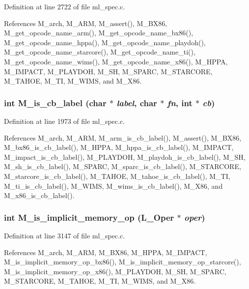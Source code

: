Definition at line 2722 of file ml\_\-spec.c.

References M\_\-arch, M\_\-ARM, M\_\-assert(), M\_\-BX86, M\_\-get\_\-opcode\_\-name\_\-arm(), M\_\-get\_\-opcode\_\-name\_\-bx86(), M\_\-get\_\-opcode\_\-name\_\-hppa(), M\_\-get\_\-opcode\_\-name\_\-playdoh(), M\_\-get\_\-opcode\_\-name\_\-starcore(), M\_\-get\_\-opcode\_\-name\_\-ti(), M\_\-get\_\-opcode\_\-name\_\-wims(), M\_\-get\_\-opcode\_\-name\_\-x86(), M\_\-HPPA, M\_\-IMPACT, M\_\-PLAYDOH, M\_\-SH, M\_\-SPARC, M\_\-STARCORE, M\_\-TAHOE, M\_\-TI, M\_\-WIMS, and M\_\-X86.
\subsubsection{\setlength{\rightskip}{0pt plus 5cm}int M\_\-is\_\-cb\_\-label (char $\ast$ {\em label}, char $\ast$ {\em fn}, int $\ast$ {\em cb})}\label{ml__spec_8c_debfbc23840033889cb4d15e8fb736c3}




Definition at line 1973 of file ml\_\-spec.c.

References M\_\-arch, M\_\-ARM, M\_\-arm\_\-is\_\-cb\_\-label(), M\_\-assert(), M\_\-BX86, M\_\-bx86\_\-is\_\-cb\_\-label(), M\_\-HPPA, M\_\-hppa\_\-is\_\-cb\_\-label(), M\_\-IMPACT, M\_\-impact\_\-is\_\-cb\_\-label(), M\_\-PLAYDOH, M\_\-playdoh\_\-is\_\-cb\_\-label(), M\_\-SH, M\_\-sh\_\-is\_\-cb\_\-label(), M\_\-SPARC, M\_\-sparc\_\-is\_\-cb\_\-label(), M\_\-STARCORE, M\_\-starcore\_\-is\_\-cb\_\-label(), M\_\-TAHOE, M\_\-tahoe\_\-is\_\-cb\_\-label(), M\_\-TI, M\_\-ti\_\-is\_\-cb\_\-label(), M\_\-WIMS, M\_\-wims\_\-is\_\-cb\_\-label(), M\_\-X86, and M\_\-x86\_\-is\_\-cb\_\-label().
\subsubsection{\setlength{\rightskip}{0pt plus 5cm}int M\_\-is\_\-implicit\_\-memory\_\-op (L\_\-Oper $\ast$ {\em oper})}\label{ml__spec_8c_bda0de63c8aa0d69767c26409bf26fbd}




Definition at line 3147 of file ml\_\-spec.c.

References M\_\-arch, M\_\-ARM, M\_\-BX86, M\_\-HPPA, M\_\-IMPACT, M\_\-is\_\-implicit\_\-memory\_\-op\_\-bx86(), M\_\-is\_\-implicit\_\-memory\_\-op\_\-starcore(), M\_\-is\_\-implicit\_\-memory\_\-op\_\-x86(), M\_\-PLAYDOH, M\_\-SH, M\_\-SPARC, M\_\-STARCORE, M\_\-TAHOE, M\_\-TI, M\_\-WIMS, and M\_\-X86.
